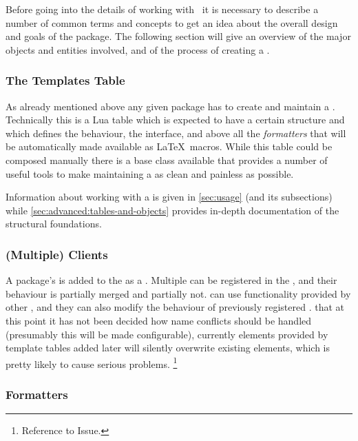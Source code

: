 \documentclass[12pt]{scrartcl}
\begin{document}
Before going into the details of working with \luatemplates\ it is
necessary to describe a number of common terms and concepts to get an idea
about the overall design and goals of the package.  The following section will give an overview of the major objects and entities involved, and of the process of creating a .

\subsubsection{The Templates Table}
\label{sec:intro-the-templates-table}

As already mentioned above any given package has to create and maintain a
.  Technically this is a Lua table which is expected to
have a certain structure and which defines the behaviour, the interface, and
above all the \emph{formatters} that will be automatically made available as
\LaTeX\ macros.  While this table could be composed manually there is a base
class  available that provides a number of useful tools
to make maintaining a  as clean and painless as possible.

Information about working with a  is given in
\vref{sec:usage} (and its subsections) while
\vref{sec:advanced:tables-and-objects} provides in-depth documentation of
the structural foundations.


\subsubsection{(Multiple) Clients}
\label{sec:intro-multiple-clients}

A package's  is added to the  as a
.  Multiple  can be registered in the
, and their behaviour is partially merged and partially
not.   can use functionality provided by other
, and they can also modify the behaviour of previously
registered .   that at this point it has not
been decided how name conflicts should be handled (presumably this will be made
configurable), currently elements provided by template tables added later will
silently overwrite existing elements, which is pretty likely to cause serious
problems.%
\footnote{ Reference to Issue.}


\subsubsection{Formatters}
\label{sec:intro-formatters}
\end{document}
